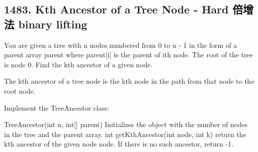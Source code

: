 \documentclass[9pt, b5paaper]{book}
\begin{document}
\subsection{1483. Kth Ancestor of a Tree Node - Hard 倍增法 binary lifting}
\label{sec-1-1-6}
You are given a tree with n nodes numbered from 0 to n - 1 in the form of a parent array parent where parent[i] is the parent of ith node. The root of the tree is node 0. Find the kth ancestor of a given node.

The kth ancestor of a tree node is the kth node in the path from that node to the root node.

Implement the TreeAncestor class:

TreeAncestor(int n, int[] parent) Initializes the object with the number of nodes in the tree and the parent array.
int getKthAncestor(int node, int k) return the kth ancestor of the given node node. If there is no such ancestor, return -1.
\end{document}
